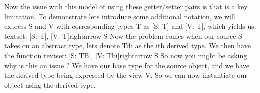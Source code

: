 {}\markdownRendererInterblockSeparator
{}Now the issue with this model of using these getter/setter pairs is that is a key limitation. To demonstrate lets introduce some additional notation, we will express \markdownRendererDollarSign{}S\markdownRendererDollarSign{} and \markdownRendererDollarSign{}V\markdownRendererDollarSign{} with corresponding types \markdownRendererDollarSign{}T\markdownRendererDollarSign{} as \markdownRendererDollarSign{}[S: T]\markdownRendererDollarSign{} and \markdownRendererDollarSign{}[V: T]\markdownRendererDollarSign{}, which yields us. \markdownRendererDollarSign{}\markdownRendererDollarSign{} \markdownRendererBackslash{}text\markdownRendererLeftBrace{}set\markdownRendererRightBrace{}: [S: T], [V: T]\markdownRendererBackslash{}rightarrow S \markdownRendererDollarSign{}\markdownRendererDollarSign{} Now the problem comes when our source \markdownRendererDollarSign{}S\markdownRendererDollarSign{} takes on an abstract type, lets denote \markdownRendererDollarSign{}T\markdownRendererLeftBrace{}di\markdownRendererRightBrace{}\markdownRendererDollarSign{} as the \markdownRendererDollarSign{}i\markdownRendererDollarSign{}th derived type. We then have the function \markdownRendererDollarSign{}\markdownRendererDollarSign{} \markdownRendererBackslash{}text\markdownRendererLeftBrace{}set\markdownRendererRightBrace{}: [S: T\markdownRendererUnderscore{}B], [V: T\markdownRendererUnderscore{}\markdownRendererLeftBrace{}bi\markdownRendererRightBrace{}]\markdownRendererBackslash{}rightarrow S \markdownRendererDollarSign{}\markdownRendererDollarSign{} So now you might be asking why is this an issue ? We have our base type for the source object, and we have the derived type being expressed by the view \markdownRendererDollarSign{}V\markdownRendererDollarSign{}. So we can now instantiate our object using the derived type. \markdownRendererInterblockSeparator
